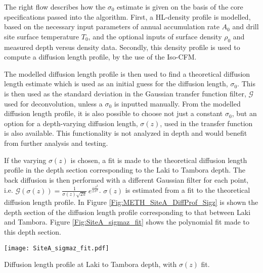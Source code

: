 \documentclass[../../CompleteThesis2/Complete_2ndDraft]{subfiles}
\begin{document}
The right flow describes how the $\sigma_0$ estimate is given on the basis of the core specifications passed into the algorithm. First, a HL-density profile is modelled, based on the necessary input parameters of annual accumulation rate $A_0$ and drill site surface temperature $T_0$, and the optional inputs of surface density $\rho_0$ and measured depth versus density data. Secondly, this density profile is used to compute a diffusion length profile, by the use of the Iso-CFM. 

The modelled diffusion length profile is then used to find a theoretical diffusion length estimate which is used as an initial guess for the diffusion length, $\sigma_0$. This is then used as the standard deviation in the Gaussian transfer function filter, $\mathcal{G}$ used for deconvolution, unless a $\sigma_0$ is inputted manually. From the modelled diffusion length profile, it is also possible to choose not just a constant $\sigma_0$, but an option for a depth-varying diffusion length, $\sigma(z)$, used in the transfer function is also available. This functionality is not analyzed in depth and would benefit from further analysis and testing.


%

If the varying $\sigma(z)$ is chosen, a fit is made to the theoretical diffusion length profile in the depth section corresponding to the Laki to Tambora depth. The back diffusion is then performed with a different Gaussian filter for each point, i.e. $\mathcal{G}(\sigma(z)) = \frac{1}{\sigma(z)\sqrt{2\pi}}\,e^{\frac{-z^2}{2\,\sigma^2}}$. $\sigma(z)$ is estimated from a fit to the theoretical diffusion length profile. In Figure \ref{Fig:METH_SiteA_DiffProf_Sigz} is shown the depth section of the diffusion length profile corresponding to that between Laki and Tambora. Figure \ref{Fig:SiteA_sigmaz_fit} shows the polynomial fit made to this depth section. 
\begin{marginfigure}
	\centering
	\texttt{[image: SiteA\_sigmaz\_fit.pdf]}
	\caption[Diffusion length profile, fit at LT]{\footnotesize Diffusion length profile at Laki to Tambora depth, with $\sigma(z)$ fit.}
	\label{Fig:SiteA_sigmaz_fit}
\end{marginfigure}
\end{document}
